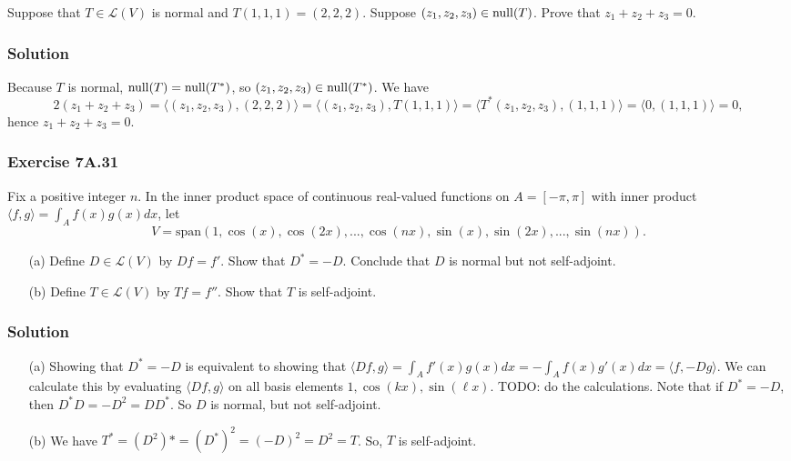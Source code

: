 Suppose that $T \in \mathcal{L}(V)$ is normal and $T(1, 1, 1) = (2, 2, 2)$.
Suppose $(z_1, z_2, z_3) \in \mathrm{null}(T)$.
Prove that $z_1 + z_2 + z_3 = 0$.

\subsubsection*{Solution}

Because $T$ is normal, $\mathrm{null}(T) = \mathrm{null}(T^*)$, so $(z_1, z_2, z_3) \in \mathrm{null}(T^*)$.
We have
\begin{equation*}
    2(z_1 + z_2 + z_3)
        = \langle (z_1, z_2, z_3), (2, 2, 2) \rangle
        = \langle (z_1, z_2, z_3), T(1, 1, 1) \rangle
        = \langle T^*(z_1, z_2, z_3), (1, 1, 1) \rangle
        = \langle 0, (1, 1, 1) \rangle
        = 0,
\end{equation*}
hence $z_1 + z_2 + z_3 = 0$.


\subsubsection*{Exercise 7A.31}

Fix a positive integer $n$.
In the inner product space of continuous real-valued functions on $A = [-\pi, \pi]$ with inner product $\langle f, g \rangle = \int_A f(x)g(x) dx$, let
\begin{equation*}
    V = \mathrm{span}(1, \cos(x), \cos(2x), ..., \cos(nx), \sin(x), \sin(2x), ..., \sin(nx)).
\end{equation*}
\begin{itemize}
    \item[(a)] Define $D \in \mathcal{L}(V)$ by $Df = f'$.
        Show that $D^* = -D$.
        Conclude that $D$ is normal but not self-adjoint.
    \item[(b)] Define $T \in \mathcal{L}(V)$ by $Tf = f''$.
        Show that $T$ is self-adjoint.
\end{itemize}

\subsubsection*{Solution}

\begin{itemize}
    \item[(a)] Showing that $D^* = -D$ is equivalent to showing that $\langle Df, g\rangle = \int_A f'(x)g(x)dx = - \int_A f(x)g'(x)dx = \langle f, -Dg \rangle$.
        We can calculate this by evaluating $\langle Df, g \rangle$ on all basis elements $1, \cos(kx), \sin(\ell x)$.
        TODO: do the calculations.
        Note that if $D^* = -D$, then $D^*D = -D^2 = DD^*$.
        So $D$ is normal, but not self-adjoint.
    \item[(b)] We have $T^* = (D^2)* = (D^*)^2 = (-D)^2 = D^2 = T$.
        So, $T$ is self-adjoint.
\end{itemize}


